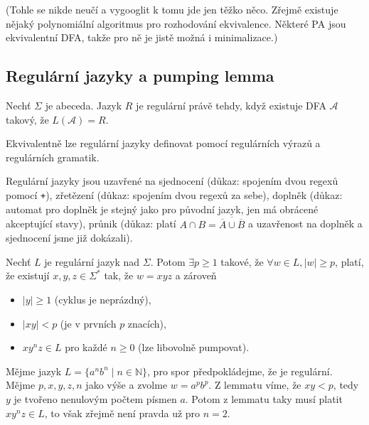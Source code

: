 
(Tohle se nikde neučí a vygooglit k tomu jde jen těžko něco. Zřejmě
existuje nějaký polynomiální algoritmus pro rozhodování ekvivalence.
Některé PA jsou ekvivalentní DFA, takže pro ně je jistě možná i
minimalizace.)

\subsection{Regulární jazyky a pumping lemma}

\begin{definition}
Nechť $\Sigma$ je abeceda. Jazyk $R$ je regulární právě tehdy, když
existuje DFA $\mathcal{A}$ takový, že $L(\mathcal{A}) = R$.
\end{definition}

Ekvivalentně lze regulární jazyky definovat pomocí regulárních výrazů a
regulárních gramatik.

Regulární jazyky jsou uzavřené na sjednocení (důkaz: spojením
dvou regexů pomocí \verb|+|), zřetězení (důkaz: spojením dvou
regexů za sebe), doplněk (důkaz: automat pro doplněk je stejný
jako pro původní jazyk, jen má obrácené akceptující stavy), průnik
(důkaz: platí $A \cap B = \overline{\overline{A} \cup \overline{B}}$ a
uzavřenost na doplněk a sjednocení jsme již dokázali).

\begin{theorem}
Nechť $L$ je regulární jazyk nad $\Sigma$.
Potom
$\exists p \geq 1$ takové,
že $\forall w \in L, \lvert w \rvert \geq p$,
platí, že existují $x,y,z \in \Sigma^*$ tak, že $w = xyz$ a zároveň

\begin{itemize}
    \item $\lvert y \rvert \geq 1$ (cyklus je neprázdný),
    \item $\lvert xy \rvert < p$ (je v prvních $p$ znacích),
    \item $xy^nz \in L$ pro každé $n \geq 0$ (lze libovolně pumpovat).
\end{itemize}
\end{theorem}

\begin{example}
    Mějme jazyk $L = \{ a^n b^n \mid n \in \mathbb{N} \}$,
    pro spor předpokládejme, že je regulární.
    Mějme $p,x,y,z,n$ jako výše a zvolme $w = a^p b^p$.
    Z lemmatu víme, že $xy < p$, tedy $y$ je tvořeno nenulovým počtem
    písmen $a$.  Potom z lemmatu taky musí platit $xy^nz \in L$, to však
    zřejmě není pravda už pro $n = 2$.
\end{example}

